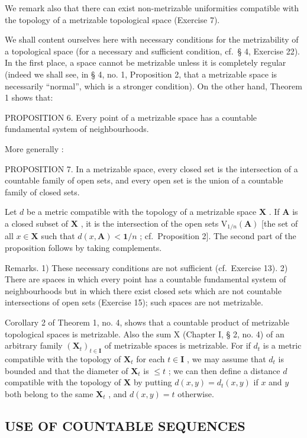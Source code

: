 We remark also that there can exist non-metrizable uniformities compatible with the topology of a metrizable topological space (Exercise 7).

We shall content ourselves here with necessary conditions for the metrizability of a topological space (for a necessary and sufficient condition, cf.~§ 4, Exercise 22). In the first place, a space cannot be metrizable unless it is completely regular (indeed we shall see, in § 4, no. 1, Proposition 2, that a metrizable space is necessarily ``normal'', which is a stronger condition). On the other hand, Theorem 1 shows that:

PROPOSITION 6. Every point of a metrizable space has a countable fundamental system of neighbourhoods.

More generally :

PROPOSITION 7. In a metrizable space, every closed set is the intersection of a countable family of open sets, and every open set is the union of a countable family of closed sets.

Let \(d\) be a metric compatible with the topology of a metrizable space \(\mathbf{X}\) . If \(\mathbf{A}\) is a closed subset of \(\mathbf{X}\) , it is the intersection of the open sets \(\mathrm{V}_{1/n}(\mathbf{A})\) {[}the set of all \(x\in\mathbf{X}\) such that \(d(x,\mathbf{A})<\mathbf{1}/n\) ; cf.~Proposition 2{]}. The second part of the proposition follows by taking complements.

Remarks. 1) These necessary conditions are not sufficient (cf.~Exercise 13). 2) There are spaces in which every point has a countable fundamental system of neighbourhoods but in which there exist closed sets which are not countable intersections of open sets (Exercise 15); such spaces are not metrizable.

Corollary 2 of Theorem 1, no. 4, shows that a countable product of metrizable topological spaces is metrizable. Also the sum X (Chapter I, § 2, no. 4) of an arbitrary family \((\mathbf{X}_t)_{t \in \mathbf{I}}\) of metrizable spaces is metrizable. For if \(d_t\) is a metric compatible with the topology of \(\mathbf{X}_t\) for each \(t \in \mathbf{I}\) , we may assume that \(d_t\) is bounded and that the diameter of \(\mathbf{X}_t\) is \(\leqslant t\) ; we can then define a distance \(d\) compatible with the topology of \(\mathbf{X}\) by putting \(d(x, y) = d_t(x, y)\) if \(x\) and \(y\) both belong to the same \(\mathbf{X}_t\) , and \(d(x, y) = t\) otherwise.

\subsection{USE OF COUNTABLE SEQUENCES}

